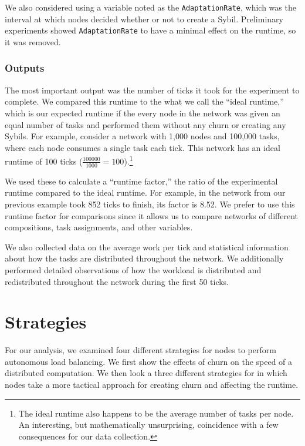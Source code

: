 We also considered using a variable noted as the \texttt{AdaptationRate}, which was the interval at which nodes decided whether or not to create a Sybil.
Preliminary experiments showed \texttt{AdaptationRate} to have a minimal effect on the runtime, so it was removed.

\subsubsection{Outputs}
The most important output was the number of ticks it took for the experiment to complete.
We compared this runtime to the what we call the ``ideal runtime,'' which is our expected runtime if the every node in the network was given an equal number of tasks and performed them without any churn or creating any Sybils.
For example, consider a network with 1,000 nodes and 100,000 tasks, where each node consumes a single task each tick. 
This network has an ideal runtime of 100 ticks ($ \frac{100000}{1000} = 100$).\footnote{The ideal runtime also happens to be the average number of tasks per node. An interesting, but mathematically unsurprising, coincidence with a few consequences for our data collection.} 

We used these to calculate a ``runtime factor,'' the ratio of the experimental runtime compared to the ideal runtime.
For example, in the network from our previous example took 852 ticks to finish, its factor is 8.52.
We prefer to use this runtime factor for comparisons since it allows us to compare networks of different compositions, task assignments, and other variables.

We also collected data on the average work per tick and statistical information about how the tasks are distributed throughout the network.
We additionally performed detailed observations of how the workload is  distributed and redistributed throughout the network during the first 50 ticks.

\section{Strategies}
\label{sec:strategies}

For our analysis, we examined four different strategies for nodes to perform autonomous load balancing.
We first show the effects of churn on the speed of a distributed computation.
We then look a three different strategies for in which nodes take a more tactical approach for creating churn and affecting the runtime.

